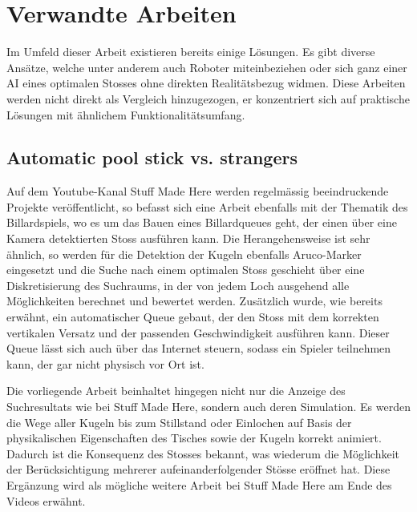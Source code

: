 \section{Verwandte Arbeiten}\label{kap:verwandte_arbeiten}
Im Umfeld dieser Arbeit existieren bereits einige Lösungen. Es gibt diverse Ansätze, welche
unter anderem auch Roboter miteinbeziehen\cite{qucosa:ein_billardroboter:1} oder sich ganz einer AI eines
optimalen Stosses ohne direkten Realitätsbezug widmen\cite{inproceedings:billiard_ai:1}.
Diese Arbeiten werden nicht direkt als Vergleich hinzugezogen,
er konzentriert sich auf praktische Lösungen mit ähnlichem Funktionalitätsumfang.

\subsection{Automatic pool stick vs. strangers}
Auf dem Youtube-Kanal \glqq Stuff Made Here\grqq{} werden regelmässig beeindruckende Projekte veröffentlicht, so befasst
sich eine Arbeit ebenfalls mit der Thematik des Billardspiels, wo es um das Bauen eines Billardqueues geht, der einen
über eine Kamera detektierten Stoss ausführen kann\cite{stuffmadehere:automaticpoolstick}. Die Herangehensweise ist
sehr ähnlich, so werden für die Detektion der Kugeln ebenfalls Aruco-Marker eingesetzt und die Suche nach einem optimalen
Stoss geschieht über eine Diskretisierung des Suchraums, in der von jedem Loch ausgehend alle Möglichkeiten berechnet und
bewertet werden. Zusätzlich wurde, wie bereits erwähnt, ein automatischer Queue gebaut, der den Stoss mit dem korrekten
vertikalen Versatz und der passenden Geschwindigkeit ausführen kann. Dieser Queue lässt sich auch über das Internet
steuern, sodass ein Spieler teilnehmen kann, der gar nicht physisch vor Ort ist.

Die vorliegende Arbeit beinhaltet hingegen nicht nur die Anzeige des Suchresultats wie bei \glqq Stuff Made Here\grqq{},
sondern auch deren Simulation. Es werden die Wege aller Kugeln bis zum
Stillstand oder Einlochen auf Basis der physikalischen Eigenschaften des Tisches sowie der Kugeln korrekt animiert.
Dadurch ist die Konsequenz des Stosses bekannt, was wiederum die Möglichkeit der Berücksichtigung
mehrerer aufeinanderfolgender Stösse eröffnet hat.
Diese Ergänzung wird als mögliche weitere Arbeit bei \glqq Stuff Made Here\grqq{} am Ende des Videos erwähnt.

